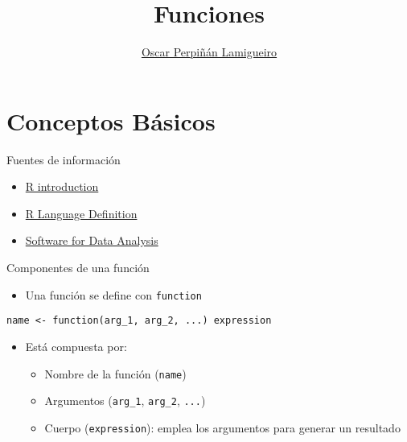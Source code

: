 \documentclass[xcolor={usenames,svgnames,dvipsnames}]{beamer}
\author{\href{https://oscarperpinan.github.io}{Oscar Perpiñán Lamigueiro}}
\date{}
\title{Funciones}
\institute[UPM]{Universidad Politécnica de Madrid}
\begin{document}
\maketitle


\section{Conceptos Básicos}
\label{sec:org807d780}

\begin{frame}[label={sec:org7b974ac}]{Fuentes de información}
\begin{itemize}
\item \href{http://cran.r-project.org/doc/manuals/R-intro.html}{R introduction}
\item \href{http://cran.r-project.org/doc/manuals/R-lang.html}{R Language Definition}
\item \href{http://www.springer.com/gb/book/9780387759357}{Software for Data Analysis}
\end{itemize}
\end{frame}
\begin{frame}[label={sec:orgd31c708},fragile]{Componentes de una función}
 \begin{itemize}
\item Una función se define con \texttt{function}
\end{itemize}
\begin{center}
\texttt{name <- function(arg\_1, arg\_2, ...) expression}
\end{center}
\begin{itemize}
\item Está compuesta por:
\begin{itemize}
\item Nombre de la función (\texttt{name})
\item Argumentos (\texttt{arg\_1}, \texttt{arg\_2}, \texttt{...})
\item Cuerpo (\texttt{expression}): emplea los argumentos para generar un resultado
\end{itemize}
\end{itemize}
\end{frame}
\end{document}
